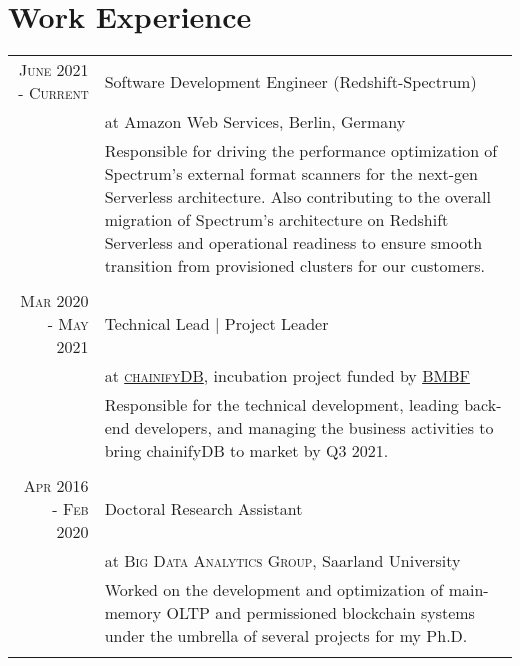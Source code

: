 \documentclass[a4paper,10pt]{article} %
\begin{document}
\section{Work Experience}
\vspace*{0.2cm}
\begin{tabular}{rp{13cm}}
\textsc{June 2021 - Current} & Software Development Engineer (Redshift-Spectrum)\\
& at Amazon Web Services, Berlin, Germany \\ 
& \footnotesize{Responsible for driving the performance optimization of Spectrum's external format scanners for the next-gen Serverless architecture. Also contributing to the overall migration of Spectrum's architecture on Redshift Serverless and operational readiness to ensure smooth transition from provisioned clusters for our customers.}\\
	\multicolumn{2}{c}{} \\
	
\textsc{Mar 2020 - May 2021} & Technical Lead | Project Leader \\
& at \href{www.chainifydb.com}{\textsc{chainifyDB}}, incubation project funded by \href{https://www.forschung-it-sicherheit-kommunikationssysteme.de/projekte/chainifydb}{BMBF}\\ 
& \footnotesize{Responsible for the technical development, leading back-end developers, and managing the business activities to bring chainifyDB to market by Q3 2021.}\\
\multicolumn{2}{c}{} \\

	
\textsc{Apr 2016 - Feb 2020} & Doctoral Research Assistant \\
                         &  at \textsc{Big Data Analytics Group}, Saarland University\\ 
& \footnotesize{Worked on the development and optimization of main-memory OLTP and permissioned blockchain systems under the umbrella of several projects for my Ph.D.}\\
\multicolumn{2}{c}{} \\


\end{tabular}
\end{document}
